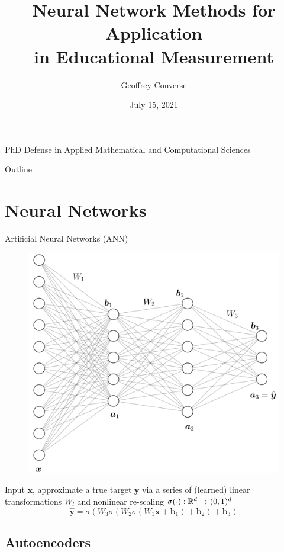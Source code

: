 \documentclass{beamer}
\title[Neural Network Methods for Application in Educational Measurement]{Neural Network Methods for Application \\ in Educational Measurement}
\author{Geoffrey Converse}
\institute{University of Iowa}
\date{July 15, 2021}
\def \R{\ensuremath \mathbb{R}}
\newcommand{\vect}[1]{\boldsymbol{#1}}
\theoremstyle{definition}
\begin{document}
\begin{frame}
  \titlepage
  \begin{center}
  {\scriptsize PhD Defense in Applied Mathematical and Computational Sciences}
  \end{center}
\end{frame}

\begin{frame}{Outline}
  \scriptsize
  \tableofcontents
\end{frame}

\section{Neural Networks}

\begin{frame}{Artificial Neural Networks (ANN)}
\begin{figure}
  \includegraphics[width=.55\textwidth]{../img/ffn_visual.png}
\end{figure}
\scriptsize{Input $\vect x$, approximate a true target $\vect y$ via a series of (learned) linear transformations $W_l$ and nonlinear re-scaling $\sigma(\cdot) : \R^d \to (0,1)^d$}
\[\hat{\vect y} = \sigma(W_3\sigma(W_2\sigma(W_1 \vect x + \vect b_1) + \vect b_2) + \vect b_3)\]
\end{frame}

\subsection{Autoencoders}
\end{document}
